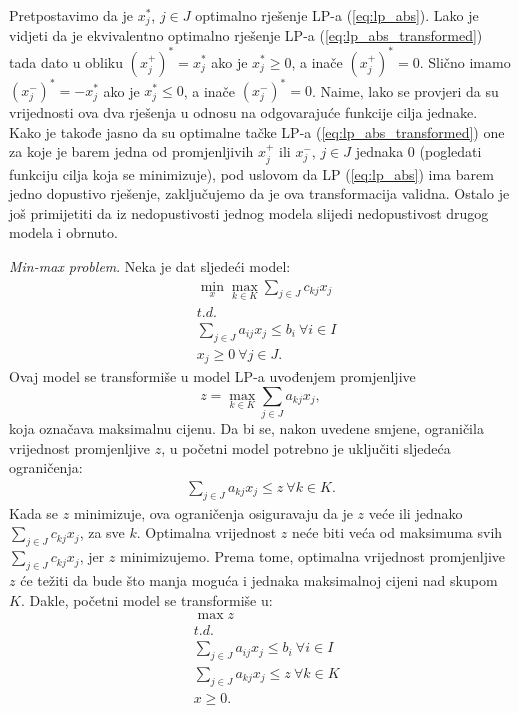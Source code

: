 \documentclass[a4paper, utf8, 11pt, colorlinks]{book}
\theoremstyle{definition}
\begin{document}
Pretpostavimo da je $x_j^*$, $j \in J$ optimalno rješenje LP-a (\ref{eq:lp_abs}).  Lako je vidjeti da je ekvivalentno optimalno rješenje LP-a (\ref{eq:lp_abs_transformed}) tada dato u obliku $(x_j^+)^* = x_j^*$  ako je $x_j^* \geq 0$, a inače $(x_j^+)^* = 0$. Slično imamo $(x_j^-)^* = - x_j^*$  ako je $x_j^* \leq 0$, a inače $(x_j^-)^* = 0$. Naime, lako se provjeri da su vrijednosti ova dva rješenja u odnosu na odgovarajuće funkcije cilja jednake. Kako je takođe jasno da su optimalne tačke LP-a (\ref{eq:lp_abs_transformed}) one za koje je barem jedna od promjenljivih $x_j^+$ ili $x_j^-$, $j \in J$  jednaka 0 (pogledati funkciju cilja koja se minimizuje), pod uslovom da LP (\ref{eq:lp_abs}) ima barem jedno dopustivo rješenje, zaključujemo da je ova transformacija validna. Ostalo je još primijetiti da iz  nedopustivosti jednog modela slijedi nedopustivost drugog modela i obrnuto. %


\emph{Min-max problem}. Neka je dat sljedeći model: 
\begin{align*}
	&\min_{x} \max_{k \in K} \sum_{j \in J} c_{kj} x_j \\
	&{t.d.} \nonumber \\
	& \sum_{j \in J} a_{ij} x_j \leq b_i\  \forall i \in I \\
	& x_j \geq 0\ \forall j \in J.
\end{align*}
Ovaj  model se transformiše u model LP-a uvođenjem promjenljive 
 $$z=\max_{k \in K} \sum_{j \in J} a_{kj}x_j,$$
  koja označava maksimalnu cijenu. Da bi se, nakon uvedene smjene, ograničila vrijednost promjenljive $z$, u početni model potrebno je uključiti sljedeća ograničenja: 
\begin{eqnarray}
	\sum_{j \in J} a_{kj} x_j \leq z\ \forall k \in K.
\end{eqnarray}
Kada se $z$ minimizuje, ova ograničenja osiguravaju da je $z$ veće ili jednako  $\sum_{j \in J} c_{kj}x_j$, za sve $k$. Optimalna vrijednost $z$ neće biti veća od maksimuma svih $\sum_{j \in J} c_{kj}x_j$, jer  $z$ minimizujemo. Prema tome, optimalna vrijednost promjenljive $z$ će težiti da bude što manja moguća i jednaka maksimalnoj cijeni nad skupom $K$. Dakle, početni model se transformiše u:
\begin{align*}
	&\max z \\
    &{t.d.} \nonumber \\
	&\sum_{j \in J} a_{ij} x_j \leq b_i\  \forall i \in I \\ 
	& 	 \sum_{j \in J} a_{kj} x_j \leq z\ \forall k \in K \\
	& x \geq 0.
\end{align*}
\end{document}
